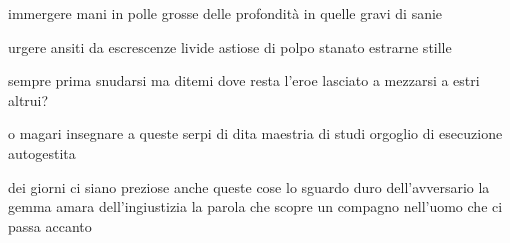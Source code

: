 \clearpage


\begin{poem}
	\begin{stanza}
		immergere mani\verseline
		in polle grosse\verseline
		delle profondità\verseline
		in quelle gravi\verseline
		di sanie
	\end{stanza}

	\begin{stanza}
		urgere ansiti\verseline
		da escrescenze\verseline
		livide\verseline
		astiose\verseline
		di polpo stanato\verseline
		estrarne stille
	\end{stanza}

	\begin{stanza}
		sempre prima snudarsi\verseline
		ma ditemi dove resta l’eroe\verseline
		lasciato a mezzarsi\verseline
		a estri altrui?
	\end{stanza}

	\begin{stanza}
		o magari insegnare a queste serpi\verseline
		di dita maestria di studi\verseline
		orgoglio di esecuzione\verseline
		autogestita
	\end{stanza}
\end{poem}

\clearpage


\begin{poem}
	\begin{stanza}
                dei giorni ci siano preziose\verseline
                anche queste cose\verseline
                lo sguardo duro dell’avversario\verseline
                la gemma amara dell’ingiustizia\verseline
                la parola che scopre un compagno nell’uomo\verseline
                che ci passa accanto
	\end{stanza}
\end{poem}

\clearpage


